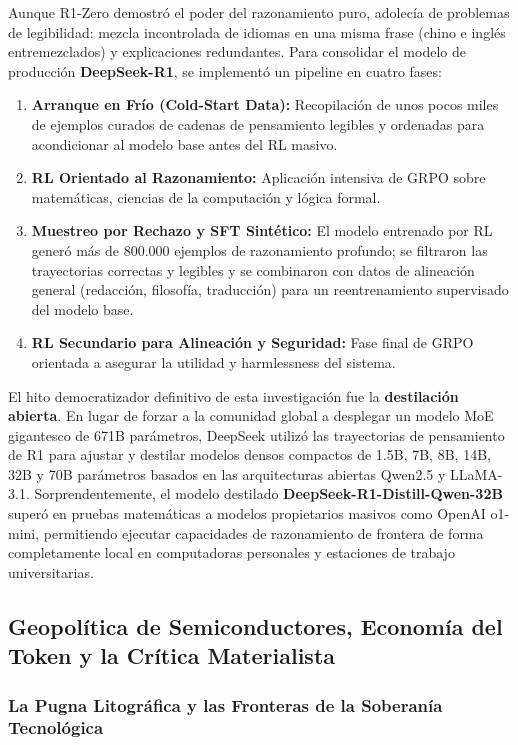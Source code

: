 Aunque R1-Zero demostró el poder del razonamiento puro, adolecía de problemas de legibilidad: mezcla incontrolada de idiomas en una misma frase (chino e inglés entremezclados) y explicaciones redundantes. Para consolidar el modelo de producción \textbf{DeepSeek-R1}, se implementó un pipeline en cuatro fases:
\begin{enumerate}
    \item \textbf{Arranque en Frío (Cold-Start Data):} Recopilación de unos pocos miles de ejemplos curados de cadenas de pensamiento legibles y ordenadas para acondicionar al modelo base antes del RL masivo.
    \item \textbf{RL Orientado al Razonamiento:} Aplicación intensiva de GRPO sobre matemáticas, ciencias de la computación y lógica formal.
    \item \textbf{Muestreo por Rechazo y SFT Sintético:} El modelo entrenado por RL generó más de 800.000 ejemplos de razonamiento profundo; se filtraron las trayectorias correctas y legibles y se combinaron con datos de alineación general (redacción, filosofía, traducción) para un reentrenamiento supervisado del modelo base.
    \item \textbf{RL Secundario para Alineación y Seguridad:} Fase final de GRPO orientada a asegurar la utilidad y harmlessness del sistema.
\end{enumerate}

El hito democratizador definitivo de esta investigación fue la \textbf{destilación abierta}. En lugar de forzar a la comunidad global a desplegar un modelo MoE gigantesco de 671B parámetros, DeepSeek utilizó las trayectorias de pensamiento de R1 para ajustar y destilar modelos densos compactos de 1.5B, 7B, 8B, 14B, 32B y 70B parámetros basados en las arquitecturas abiertas Qwen2.5 y LLaMA-3.1. Sorprendentemente, el modelo destilado \textbf{DeepSeek-R1-Distill-Qwen-32B} superó en pruebas matemáticas a modelos propietarios masivos como OpenAI o1-mini, permitiendo ejecutar capacidades de razonamiento de frontera de forma completamente local en computadoras personales y estaciones de trabajo universitarias.

\vspace{0.4cm}

\subsection{Geopolítica de Semiconductores, Economía del Token y la Crítica Materialista}

\subsubsection{La Pugna Litográfica y las Fronteras de la Soberanía Tecnológica}

